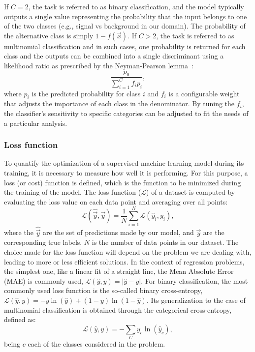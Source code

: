 If $C = 2$, the task is referred to as binary classification, and the model typically outputs a single value representing the probability that the input belongs to one of the two classes (e.g., signal vs background in our domain). The probability of the alternative class is simply $1 - f(\vec{x})$. If $C > 2$, the task is referred to as multinomial classification and in such cases, one probability is returned for each class and the outputs can be combined into a single discriminant using a likelihood ratio as prescribed by the Neyman-Pearson lemma~\cite{Neyman:1933wgr}:
\begin{equation}
    \frac{p_0}{\sum_{i=1}^C f_i p_i},
\end{equation}
where $p_i$ is the predicted probability for class $i$ and $f_i$ is a configurable weight that adjusts the importance of each class in the denominator. By tuning the $f_i$, the classifier’s sensitivity to specific categories can be adjusted to fit the needs of a particular analysis.

\subsubsection*{Loss function}

To quantify the optimization of a supervised machine learning model during its training, it is necessary to measure how well it is performing. For this purpose, a loss (or cost) function is defined, which is the function to be minimized during the training of the model.  
The loss function ($\mathcal{L}$) of a dataset is computed by evaluating the loss value on each data point and averaging over all points:
\begin{equation}
    \mathcal{L}(\hat{\vec{y}},\vec{y}) = \frac{1}{N}\sum^{N}_{i=1} \mathcal{L}(\hat{y}_{i},y_{i}),
\end{equation}
where the $\hat{\vec{y}}$ are the set of predictions made by our model, and ${\vec{y}}$ are the corresponding true labels, $N$ is the number of data points in our dataset. The choice made for the loss function will depend on the problem we are dealing with, leading to more or less efficient solutions.
In the context of regression problems, the simplest one, like a linear fit of a straight line, the Mean Absolute Error (MAE) is commonly used, $\mathcal{L}(\hat{y},y) = |\hat{y} - y|$.
For binary classification, the most commonly used loss function is the so-called binary cross-entropy, $\mathcal{L}(\hat{y},y) = -y\ln(\hat{y}) + (1-y)\ln(1-\hat{y})$.
Its generalization to the case of multinomial classification is obtained through the categorical cross-entropy, defined as:
\begin{equation}
    \mathcal{L}(\hat{y},y) = - \sum_{C} y_{c}\ln(\hat{y}_{c}),
\end{equation}
being $c$ each of the classes considered in the problem.
